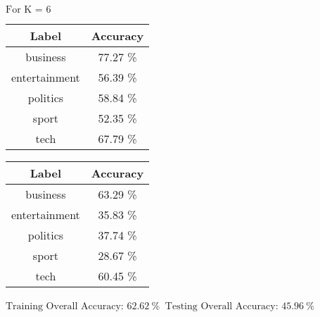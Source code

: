 \documentclass[8pt]{extarticle}
\begin{document}
    $\displaystyle \text{For K = }6$
    \begin{center}
        \quad
    \end{center}
    \begin{center}
        \begin{tabular}{cc}
            \hline
            Label & Accuracy\\
            \hline
            business &   77.27 \% \\
       entertainment &   56.39 \% \\
           politics  &   58.84 \% \\
              sport  &   52.35 \% \\
               tech  &   67.79 \%
         \end{tabular}
         \quad
        \begin{tabular}{cc}
            \hline
            Label & Accuracy\\
            \hline
            business &   63.29 \% \\
        entertainment &  35.83 \% \\
           politics  &   37.74 \% \\
              sport  &   28.67  \% \\
               tech  &   60.45 \%
        \end{tabular}
    \end{center}
    \begin{center}
        $\displaystyle \text{Training Overall Accuracy:\ }62.62\ \%$
        $\displaystyle \ \text{Testing Overall Accuracy:\ }45.96\ \%$
    \end{center}



\end{document}
